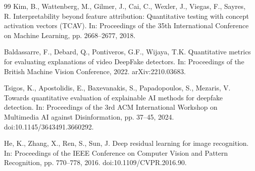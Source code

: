 \documentclass[preprint,12pt,number]{elsarticle}
\begin{document}
\begin{thebibliography}{99}
Kim, B., Wattenberg, M., Gilmer, J., Cai, C., Wexler, J., Viegas, F., Sayres, R. Interpretability beyond feature attribution: Quantitative testing with concept activation vectors (TCAV). In: Proceedings of the 35th International Conference on Machine Learning, pp. 2668--2677, 2018.

Baldassarre, F., Debard, Q., Pontiveros, G.F., Wijaya, T.K. Quantitative metrics for evaluating explanations of video DeepFake detectors. In: Proceedings of the British Machine Vision Conference, 2022. arXiv:2210.03683.

Tsigos, K., Apostolidis, E., Baxevanakis, S., Papadopoulos, S., Mezaris, V. Towards quantitative evaluation of explainable AI methods for deepfake detection. In: Proceedings of the 3rd ACM International Workshop on Multimedia AI against Disinformation, pp. 37--45, 2024. doi:10.1145/3643491.3660292.

He, K., Zhang, X., Ren, S., Sun, J. Deep residual learning for image recognition. In: Proceedings of the IEEE Conference on Computer Vision and Pattern Recognition, pp. 770--778, 2016. doi:10.1109/CVPR.2016.90.

\end{thebibliography}
\end{document}
